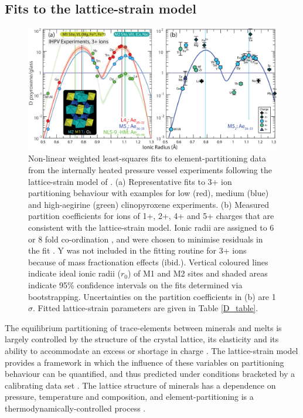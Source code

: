 \documentclass[review,authoryear,12pt]{elsarticle}
\begin{document}
\subsection{Fits to the lattice-strain model}

        \begin{figure}[tb]
        \begin{center}
        \includegraphics[width=1\textwidth]{8_Latticestrain-01.eps}
        \caption[Lattice-strain fits to  element-partition coefficients]{Non-linear weighted least-squares fits to element-partitioning data from the internally heated pressure vessel experiments following the lattice-strain model of \citet{Blundy1994}. (a) Representative fits to 3+ ion partitioning behaviour with examples for low (red), medium (blue) and high-aegirine (green) clinopyroxene experiments. (b) Measured partition coefficients for ions of 1+, 2+, 4+ and 5+ charges that are consistent with the lattice-strain model. Ionic radii are assigned to 6 or 8 fold co-ordination \citep{Shannon1976}, and were chosen to minimise residuals in the fit \citep[cf.][]{Olin2010}. Y was not included in the fitting routine for 3+ ions because of mass fractionation effects (ibid.).
        Vertical coloured lines indicate ideal ionic radii ($r_0$) of M1 and M2 sites and shaded areas indicate 95\% confidence intervals on the fits determined via bootstrapping. Uncertainties on the partition coefficients in (b) are 1$\sigma$. Fitted lattice-strain parameters are given in Table \ref{D_table}.}
        \label{8_Latticestrain3}
        \end{center}
        \end{figure}

The equilibrium partitioning of trace-elements between minerals and melts is largely controlled by the structure of the crystal lattice, its elasticity \citep{Onuma1968, Kumazawa1969, Weidner1982} and its ability to accommodate an excess or shortage in charge \citep{Blundy1998, Wood2001charge, Hanchar2001, Corgne2005CMP}. The lattice-strain model provides a framework in which the influence of these variables on partitioning behaviour can be quantified, and thus predicted under conditions bracketed by a calibrating data set \citep{Onuma1968, Blundy1994, Wood2014}. The lattice structure of minerals has a dependence on pressure, temperature and composition, and element-partitioning is a thermodynamically-controlled process \citep[e.g.][]{Wood1997}.
\end{document}
